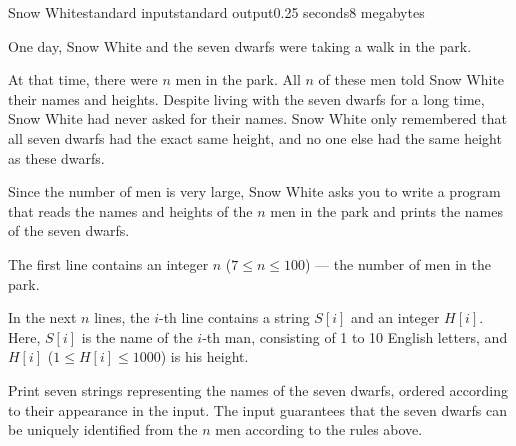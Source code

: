 \begin{problem}{Snow White}{standard input}{standard output}{0.25 seconds}{8 megabytes}

One day, Snow White and the seven dwarfs were taking a walk in the park.

At that time, there were $n$ men in the park. 
All $n$ of these men told Snow White their names and heights. 
Despite living with the seven dwarfs for a long time, Snow White had never asked for their names. 
Snow White only remembered that all seven dwarfs had the exact same height, and no one else had the same height as these dwarfs.

Since the number of men is very large, Snow White asks you to write a program that reads the names and heights of the $n$ men in the park and prints the names of the seven dwarfs.

\InputFile
The first line contains an integer $n$ ($7 \le n \le 100$) --- the number of men in the park.

In the next $n$ lines, the $i$-th line contains a string $S[i]$ and an integer $H[i]$. 
Here, $S[i]$ is the name of the $i$-th man, consisting of 1 to 10 English letters, and $H[i]$ ($1 \le H[i] \le 1000$) is his height.

\OutputFile
Print seven strings representing the names of the seven dwarfs, ordered according to their appearance in the input. 
The input guarantees that the seven dwarfs can be uniquely identified from the $n$ men according to the rules above.

\Examples

\begin{example}
%
%
\end{example}

\end{problem}

